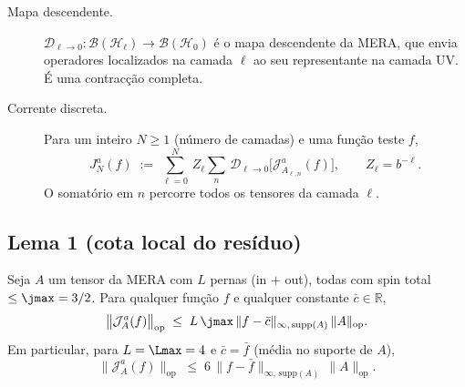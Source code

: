 \begin{description}
\item[Mapa descendente.] $\mathcal{D}_{\ell\to 0}: \mathcal{B}(\mathcal{H}_\ell)
\to \mathcal{B}(\mathcal{H}_0)$ é o mapa descendente da MERA,
que envia operadores localizados na camada $\ell$ ao seu
representante na camada UV. É uma contracção completa.

\item[Corrente discreta.] Para um inteiro $N \ge 1$ (número de camadas)
e uma função teste $f$,
\begin{equation}
  J_N^a(f) \;:=\; \sum_{\ell=0}^{N}\, Z_\ell
  \sum_{n}\, \mathcal{D}_{\ell \to 0}\!\bigl[\mathcal{J}^a_{A_{\ell,n}}(f)\bigr],
  \qquad Z_\ell = b^{-\ell}.
  \label{eq:def_corrente_discreta}
\end{equation}
O somatório em $n$ percorre todos os tensores da camada $\ell$.
\end{description}

\subsection{Lema 1 (cota local do resíduo)}

\begin{lemma}\label{lem:cota_local}
Seja $A$ um tensor da MERA com $L$ pernas (in $+$ out), todas com
spin total $\le \jmax = 3/2$. Para qualquer função $f$ e qualquer
constante $\bar c \in \mathbb{R}$,
\begin{equation}
  \bigl\|\mathcal{J}_A^a(f)\bigr\|_{\mathrm{op}}
  \;\le\; L\,\jmax\,\|f - \bar c\|_{\infty,\,\mathrm{supp}(A)} \,\|A\|_{\mathrm{op}}.
  \label{eq:lema1}
\end{equation}
Em particular, para $L = \Lmax = 4$ e $\bar c = \bar f$ (média no
suporte de $A$),
\begin{equation}
  \bigl\|\mathcal{J}_A^a(f)\bigr\|_{\mathrm{op}}
  \;\le\; 6\,\|f - \bar f\|_{\infty,\,\mathrm{supp}(A)} \,\|A\|_{\mathrm{op}}.
  \label{eq:lema1_explicit}
\end{equation}
\end{lemma}

